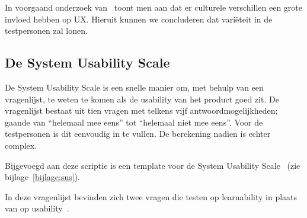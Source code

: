 In voorgaand onderzoek van~\textcite{Marcus2006} toont men aan dat er culturele verschillen een grote invloed hebben op UX. Hieruit kunnen we concluderen dat variëteit in de testpersonen zal lonen.

\subsection{De System Usability Scale}

De System Usability Scale is een snelle manier om, met behulp van een vragenlijst, te weten te komen als de usability van het product goed zit. De vragenlijst bestaat uit tien vragen met telkens vijf antwoordmogelijkheden; gaande van ``helemaal mee eens'' tot ``helemaal niet mee eens''. Voor de testpersonen is dit eenvoudig in te vullen. De berekening nadien is echter complex.

Bijgevoegd aan deze scriptie is een template voor de System Usability Scale~\autocite{Calisto2018} (zie bijlage~\ref{bijlage:sus}).

In deze vragenlijst bevinden zich twee vragen die testen op learnability in plaats van op usability~\autocite{Lewis2009}.


